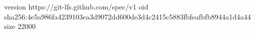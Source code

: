 version https://git-lfs.github.com/spec/v1
oid sha256:4e5a986fa4239103ea3d9072dd600de3d4c2415c5883fbfeafbfb8944a1d4a44
size 22000
